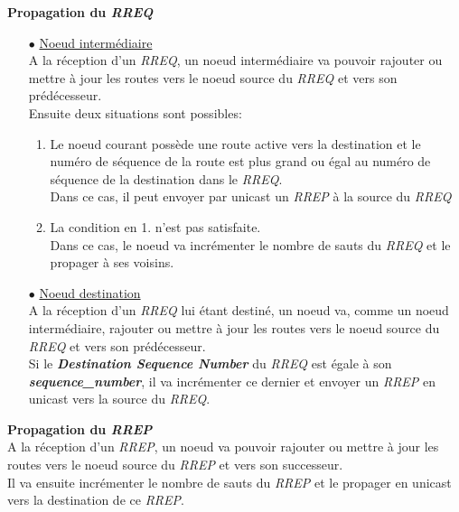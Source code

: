         \textbf{Propagation du \textit{RREQ}}\\
        \begin{itemize}
            \item[$\bullet$] \underline{Noeud intermédiaire}\\
                A la réception d'un \textit{RREQ}, un noeud intermédiaire va pouvoir rajouter ou mettre à jour
                les routes vers le noeud source du \textit{RREQ} et vers son prédécesseur.\\
                Ensuite deux situations sont possibles:
                \begin{enumerate}
                    \item Le noeud courant possède une route active vers la destination et le numéro de séquence de la route est plus grand 
                        ou égal au numéro de séquence de la destination dans le \textit{RREQ}.\\
                        Dans ce cas, il peut envoyer par unicast un \textit{RREP} à la source du \textit{RREQ}
                    \item La condition en 1. n'est pas satisfaite.\\
                        Dans ce cas, le noeud va incrémenter le nombre de sauts du \textit{RREQ} et le propager à ses voisins.\\
                \end{enumerate}
                

            \item[$\bullet$] \underline{Noeud destination}\\
                A la réception d'un \textit{RREQ} lui étant destiné, un noeud va, comme un noeud intermédiaire, 
                rajouter ou mettre à jour les routes vers le noeud source du \textit{RREQ} et vers son prédécesseur.\\
                Si le \textbf{\textit{Destination Sequence Number}} du \textit{RREQ} est égale à son \textbf{\textit{sequence\_number}},
                il va incrémenter ce dernier et envoyer un \textit{RREP} en unicast vers la source du \textit{RREQ}.\\
             
        \end{itemize}


        \textbf{Propagation du \textit{RREP}}\\
            A la réception d'un \textit{RREP}, un noeud va pouvoir rajouter ou mettre à jour
            les routes vers le noeud source du \textit{RREP} et vers son successeur.\\
            Il va ensuite incrémenter le nombre de sauts du \textit{RREP} et le propager en unicast vers la destination de ce \textit{RREP}.\\

